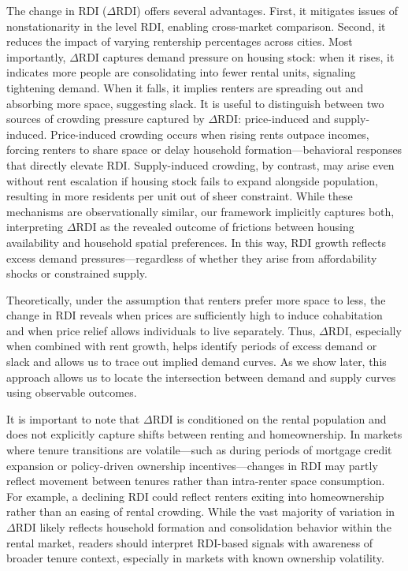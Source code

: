 \documentclass[APA,Times1COL]{WileyNJDv5} %
\begin{document}
The change in RDI (\( \Delta \text{RDI} \)) offers several advantages. First, it mitigates issues of nonstationarity in the level RDI, enabling cross-market comparison. Second, it reduces the impact of varying rentership percentages across cities. Most importantly, \( \Delta \text{RDI} \) captures demand pressure on housing stock: when it rises, it indicates more people are consolidating into fewer rental units, signaling tightening demand. When it falls, it implies renters are spreading out and absorbing more space, suggesting slack. It is useful to distinguish between two sources of crowding pressure captured by $\Delta \text{RDI}$: price-induced and supply-induced. Price-induced crowding occurs when rising rents outpace incomes, forcing renters to share space or delay household formation—behavioral responses that directly elevate RDI. Supply-induced crowding, by contrast, may arise even without rent escalation if housing stock fails to expand alongside population, resulting in more residents per unit out of sheer constraint. While these mechanisms are observationally similar, our framework implicitly captures both, interpreting $\Delta \text{RDI}$ as the revealed outcome of frictions between housing availability and household spatial preferences. In this way, RDI growth reflects excess demand pressures—regardless of whether they arise from affordability shocks or constrained supply.


Theoretically, under the assumption that renters prefer more space to less, the change in RDI reveals when prices are sufficiently high to induce cohabitation and when price relief allows individuals to live separately. Thus, \( \Delta \text{RDI} \), especially when combined with rent growth, helps identify periods of excess demand or slack and allows us to trace out implied demand curves. As we show later, this approach allows us to locate the intersection between demand and supply curves using observable outcomes.

It is important to note that \(\Delta \text{RDI}\) is conditioned on the rental population and does not explicitly capture shifts between renting and homeownership. In markets where tenure transitions are volatile—such as during periods of mortgage credit expansion or policy-driven ownership incentives—changes in RDI may partly reflect movement between tenures rather than intra-renter space consumption. For example, a declining RDI could reflect renters exiting into homeownership rather than an easing of rental crowding. While the vast majority of variation in \(\Delta \text{RDI}\) likely reflects household formation and consolidation behavior within the rental market, readers should interpret RDI-based signals with awareness of broader tenure context, especially in markets with known ownership volatility.
\end{document}
